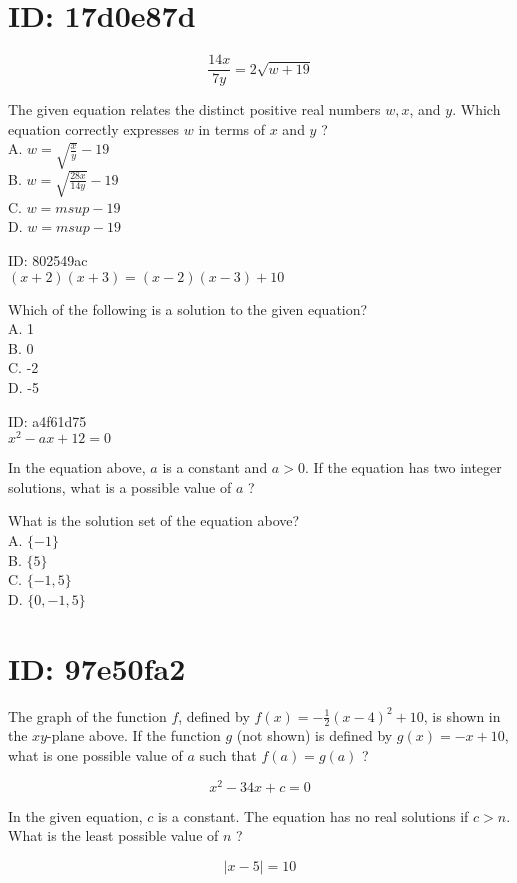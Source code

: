 \section*{ID: 17d0e87d}
$$
\frac{14 x}{7 y}=2 \sqrt{w+19}
$$

The given equation relates the distinct positive real numbers $w, x$, and $y$. Which equation correctly expresses $w$ in terms of $x$ and $y$ ?\\
A. $w=\sqrt{\frac{x}{y}}-19$\\
B. $w=\sqrt{\frac{28 x}{14 y}}-19$\\
C. $w=m s u p-19$\\
D. $w=m s u p-19$

ID: 802549ac\\
$(x+2)(x+3)=(x-2)(x-3)+10$

Which of the following is a solution to the given equation?\\
A. 1\\
B. 0\\
C. -2\\
D. -5

ID: a4f61d75\\
$x^{2}-a x+12=0$

In the equation above, $a$ is a constant and $a>0$. If the equation has two integer solutions, what is a possible value of $a$ ?

What is the solution set of the equation above?\\
A. $\{-1\}$\\
B. $\{5\}$\\
C. $\{-1,5\}$\\
D. $\{0,-1,5\}$

\section*{ID: 97e50fa2}


The graph of the function $f$, defined by $f(x)=-\frac{1}{2}(x-4)^{2}+10$, is shown in the $x y$-plane above. If the function $g$ (not shown) is defined by $g(x)=-x+10$, what is one possible value of $a$ such that $f(a)=g(a)$ ?

$$
x^{2}-34 x+c=0
$$

In the given equation, $c$ is a constant. The equation has no real solutions if $c>n$. What is the least possible value of $n$ ?

$$
|x-5|=10
$$

